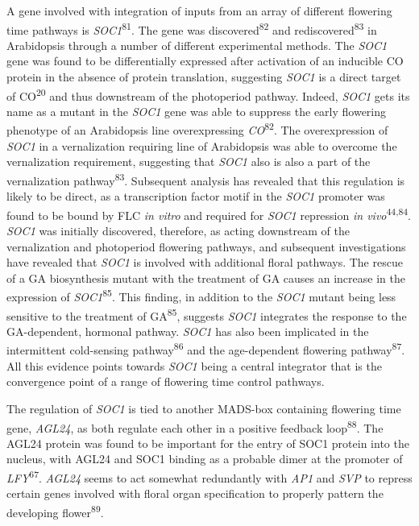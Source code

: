 \documentclass[12pt,]{book}
\begin{document}
A gene involved with integration of inputs from an array of different
flowering time pathways is \emph{SOC1}\textsuperscript{81}. The gene was
discovered\textsuperscript{82} and rediscovered\textsuperscript{83} in
Arabidopsis through a number of different experimental methods. The
\emph{SOC1} gene was found to be differentially expressed after
activation of an inducible CO protein in the absence of protein
translation, suggesting \emph{SOC1} is a direct target of
CO\textsuperscript{20} and thus downstream of the photoperiod pathway.
Indeed, \emph{SOC1} gets its name as a mutant in the \emph{SOC1} gene
was able to suppress the early flowering phenotype of an Arabidopsis
line overexpressing \emph{CO}\textsuperscript{82}. The overexpression of
\emph{SOC1} in a vernalization requiring line of Arabidopsis was able to
overcome the vernalization requirement, suggesting that \emph{SOC1} also
is also a part of the vernalization pathway\textsuperscript{83}.
Subsequent analysis has revealed that this regulation is likely to be
direct, as a transcription factor motif in the \emph{SOC1} promoter was
found to be bound by FLC \emph{in vitro} and required for \emph{SOC1}
repression \emph{in vivo}\textsuperscript{44,84}. \emph{SOC1} was
initially discovered, therefore, as acting downstream of the
vernalization and photoperiod flowering pathways, and subsequent
investigations have revealed that \emph{SOC1} is involved with
additional floral pathways. The rescue of a GA biosynthesis mutant with
the treatment of GA causes an increase in the expression of
\emph{SOC1}\textsuperscript{85}. This finding, in addition to the
\emph{SOC1} mutant being less sensitive to the treatment of
GA\textsuperscript{85}, suggests \emph{SOC1} integrates the response to
the GA-dependent, hormonal pathway. \emph{SOC1} has also been implicated
in the intermittent cold-sensing pathway\textsuperscript{86} and the
age-dependent flowering pathway\textsuperscript{87}. All this evidence
points towards \emph{SOC1} being a central integrator that is the
convergence point of a range of flowering time control pathways.

The regulation of \emph{SOC1} is tied to another MADS-box containing
flowering time gene, \emph{AGL24}, as both regulate each other in a
positive feedback loop\textsuperscript{88}. The AGL24 protein was found
to be important for the entry of SOC1 protein into the nucleus, with
AGL24 and SOC1 binding as a probable dimer at the promoter of
\emph{LFY}\textsuperscript{67}. \emph{AGL24} seems to act somewhat
redundantly with \emph{AP1} and \emph{SVP} to repress certain genes
involved with floral organ specification to properly pattern the
developing flower\textsuperscript{89}.
\end{document}
